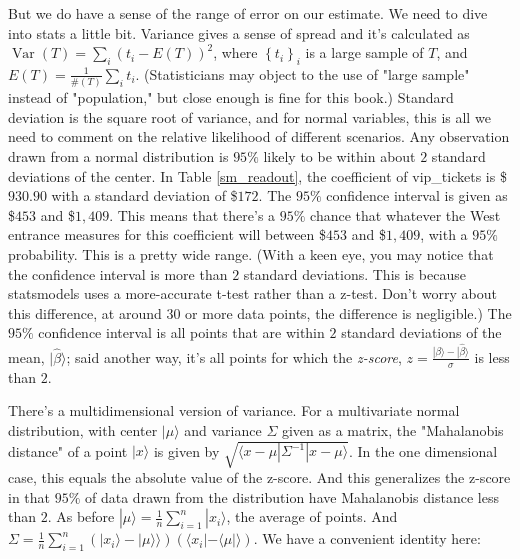 \documentclass{amsbook}
\begin{document}
But we do have a sense of the range of error on our estimate.  We need to dive into stats a little bit.  Variance gives a sense of spread and it's calculated as $\operatorname{Var}(T)=\sum_i\left(t_i-E(T)\right)^2$, where $\left\{t_i\right\}_i$ is a large sample of $T$, and $E(T)=\frac{1}{\#(T)}\sum_it_i$.  (Statisticians may object to the use of "large sample" instead of "population," but close enough is fine for this book.)  Standard deviation is the square root of variance, and for normal variables, this is all we need to comment on the relative likelihood of different scenarios.  Any observation drawn from a normal distribution is $95\%$ likely to be within about $2$ standard deviations of the center.  In Table \ref{sm_readout}, the coefficient of vip\_tickets is \$$930.90$ with a standard deviation of \$$172$.  The $95\%$ confidence interval is given as \$$453$ and \$$1,409$.  This means that there's a $95\%$ chance that whatever the West entrance measures for this coefficient will between \$$453$ and \$$1,409$, with a $95\%$ probability.  This is a pretty wide range.  (With a keen eye, you may notice that the confidence interval is more than $2$ standard deviations.  This is because statsmodels uses a more-accurate t-test rather than a z-test.  Don't worry about this difference, at around $30$ or more data points, the difference is negligible.)  The $95\%$ confidence interval is all points that are within $2$ standard deviations of the mean, $|\hat\beta\rangle$; said another way, it's all points for which the {\em z-score}, $z=\frac{|\beta\rangle-|\hat\beta\rangle}{\sigma}$ is less than $2$.

There's a multidimensional version of variance.  For a multivariate normal distribution, with center $|\mu\rangle$ and variance $\Sigma$ given as a matrix, the "Mahalanobis distance" of a point $|x\rangle$ is given by $\sqrt{\langle x-\mu|\Sigma^{-1}|x-\mu\rangle}$.  In the one dimensional case, this equals the absolute value of the z-score.  And this generalizes the z-score in that $95\%$ of data drawn from the distribution have Mahalanobis distance less than $2$.  As before $|\mu\rangle=\frac{1}{n}\sum_{i=1}^n|x_i\rangle$, the average of points.  And $\Sigma=\frac{1}{n}\sum_{i=1}^n\left(|x_i\rangle-|\mu\rangle\rangle\right)\left(\langle x_i|-\langle\mu|\rangle\right)$.  We have a convenient identity here:
\end{document}
